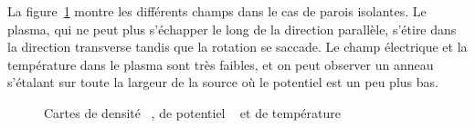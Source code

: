 \begin{refsection}
La figure~\ref{CybeleCartesIsolant} montre les différents champs dans le cas de
parois isolantes. Le plasma, qui ne peut plus s'échapper le long de la direction
parallèle, s'étire dans la direction transverse tandis que la rotation se
saccade.
Le champ électrique et la température dans le plasma sont très faibles, et on
peut observer un anneau s'étalant sur toute la largeur de la source où le
potentiel est un peu plus bas.

\begin{figure}[!htbp]
  \centering
    \caption{Cartes de densité ~, de
    potentiel ~ et de
    température }
    \label{CybeleCartesIsolant}
\end{figure}		




\end{refsection}
